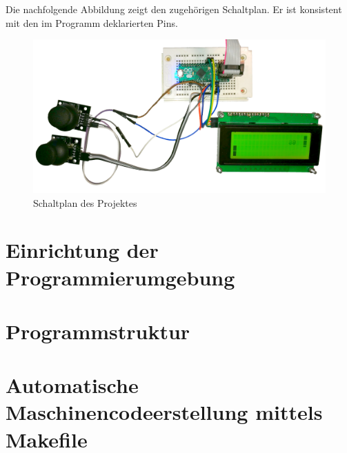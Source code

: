 Die nachfolgende Abbildung zeigt den zugehörigen Schaltplan. Er ist konsistent mit den im Programm deklarierten Pins.
\begin{figure}[H]
\includegraphics[width=\textwidth]{./Bilder/Aufbau.jpg}
\caption{Schaltplan des Projektes}
\label{fig:Schaltplan}
\end{figure}

\section{Einrichtung der Programmierumgebung}
\label{sec:IDE}

\section{Programmstruktur}
\label{sec:Prog}

\section{Automatische Maschinencodeerstellung mittels Makefile}
\label{sec:Make}


 

